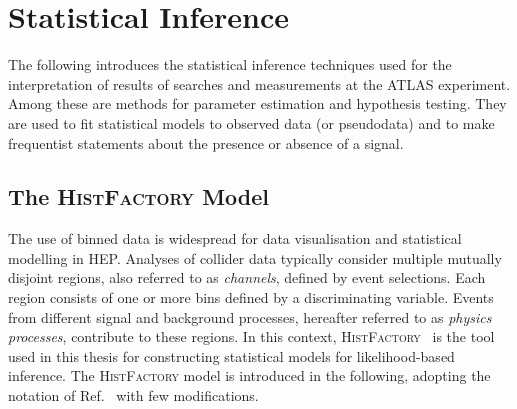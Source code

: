 \section{Statistical Inference}%
\label{sec:statistical_inference}

The following introduces the statistical inference techniques used for the
interpretation of results of searches and measurements at the ATLAS experiment.
Among these are methods for parameter estimation and hypothesis testing. They
are used to fit statistical models to observed data (or pseudodata) and to make
frequentist statements about the presence or absence of a signal.


\subsection{The \textsc{HistFactory} Model}%
\label{sec:histfactory}

The use of binned data
is widespread for data visualisation and statistical modelling in HEP. Analyses
of collider data typically consider multiple mutually disjoint regions, also
referred to as \emph{channels}, defined by event selections. Each region
consists of one or more bins defined by a discriminating variable. Events from
different signal and background processes, hereafter referred to as
\emph{physics processes}, contribute to these regions. In this context,
\textsc{HistFactory}~\cite{cranmer2012} is the tool used in this thesis for
constructing statistical models for likelihood-based inference. The
\textsc{HistFactory} model is introduced in the following, adopting the notation
of Ref.~\cite{cranmer2012} with few modifications.

